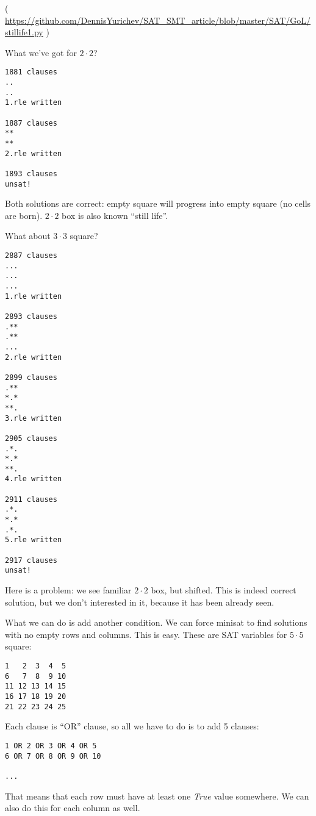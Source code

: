 

( \url{https://github.com/DennisYurichev/SAT_SMT_article/blob/master/SAT/GoL/stillife1.py} )

What we've got for $2 \cdot 2$?

\begin{lstlisting}
1881 clauses
..
..
1.rle written

1887 clauses
**
**
2.rle written

1893 clauses
unsat!
\end{lstlisting}

Both solutions are correct: empty square will progress into empty square (no cells are born).
$2 \cdot 2$ box is also known ``still life''.

What about $3 \cdot 3$ square?

\begin{lstlisting}
2887 clauses
...
...
...
1.rle written

2893 clauses
.**
.**
...
2.rle written

2899 clauses
.**
*.*
**.
3.rle written

2905 clauses
.*.
*.*
**.
4.rle written

2911 clauses
.*.
*.*
.*.
5.rle written

2917 clauses
unsat!
\end{lstlisting}

Here is a problem: we see familiar $2 \cdot 2$ box, but shifted.
This is indeed correct solution, but we don't interested in it, because it has been already seen.

What we can do is add another condition. We can force minisat to find solutions with no empty rows and columns.
This is easy.
These are SAT variables for $5 \cdot 5$ square:

\begin{lstlisting}
1   2  3  4  5
6   7  8  9 10
11 12 13 14 15
16 17 18 19 20
21 22 23 24 25
\end{lstlisting}

Each clause is ``OR'' clause, so all we have to do is to add 5 clauses:

\begin{lstlisting}
1 OR 2 OR 3 OR 4 OR 5
6 OR 7 OR 8 OR 9 OR 10

...

\end{lstlisting}

That means that each row must have at least one \textit{True} value somewhere.
We can also do this for each column as well.

